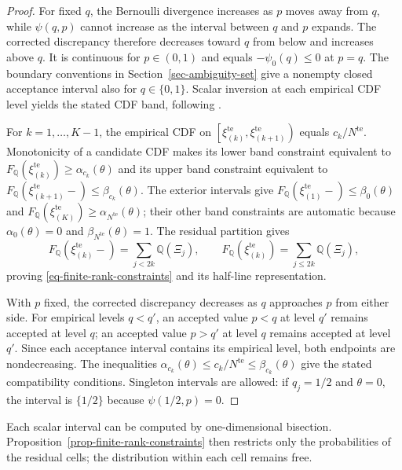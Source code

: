 \begin{proof}
  For fixed $q$, the Bernoulli divergence increases as $p$ moves away from $q$, while $\psi(q,p)$ cannot increase as the interval between $q$ and $p$ expands. The corrected discrepancy therefore decreases toward $q$ from below and increases above $q$. It is continuous for $p\in(0,1)$ and equals $-\psi_0(q)\le0$ at $p=q$. The boundary conventions in Section~\ref{sec-ambiguity-set} give a nonempty closed acceptance interval also for $q\in\{0,1\}$. Scalar inversion at each empirical CDF level yields the stated CDF band, following \citet[Supplement, Section~S.6]{L.J23}.

  For $k=1,\ldots,K-1$, the empirical CDF on $\left[\xi_{(k)}^{\mathrm{te}},\xi_{(k+1)}^{\mathrm{te}}\right)$ equals $c_k/N^{\mathrm{te}}$. Monotonicity of a candidate CDF makes its lower band constraint equivalent to $F_{\mathbb Q}\left(\xi_{(k)}^{\mathrm{te}}\right)\ge\alpha_{c_k}(\theta)$ and its upper band constraint equivalent to $F_{\mathbb Q}\left(\xi_{(k+1)}^{\mathrm{te}}-\right)\le\beta_{c_k}(\theta)$. The exterior intervals give $F_{\mathbb Q}\left(\xi_{(1)}^{\mathrm{te}}-\right)\le\beta_0(\theta)$ and $F_{\mathbb Q}\left(\xi_{(K)}^{\mathrm{te}}\right)\ge\alpha_{N^{\mathrm{te}}}(\theta)$; their other band constraints are automatic because $\alpha_0(\theta)=0$ and $\beta_{N^{\mathrm{te}}}(\theta)=1$. The residual partition gives
  \[
    F_{\mathbb Q}\left(\xi_{(k)}^{\mathrm{te}}-\right)=\sum_{j<2k}\mathbb Q(\Xi_j),
    \qquad
    F_{\mathbb Q}\left(\xi_{(k)}^{\mathrm{te}}\right)=\sum_{j\le2k}\mathbb Q(\Xi_j),
  \]
  proving \eqref{eq-finite-rank-constraints} and its half-line representation.

  With $p$ fixed, the corrected discrepancy decreases as $q$ approaches $p$ from either side. For empirical levels $q<q'$, an accepted value $p<q$ at level $q'$ remains accepted at level $q$; an accepted value $p>q'$ at level $q$ remains accepted at level $q'$. Since each acceptance interval contains its empirical level, both endpoints are nondecreasing. The inequalities $\alpha_{c_k}(\theta)\le c_k/N^{\mathrm{te}}\le\beta_{c_k}(\theta)$ give the stated compatibility conditions. Singleton intervals are allowed: if $q_j=1/2$ and $\theta=0$, the interval is $\{1/2\}$ because $\psi(1/2,p)=0$.
\end{proof}

Each scalar interval can be computed by one-dimensional bisection. Proposition~\ref{prop-finite-rank-constraints} then restricts only the probabilities of the residual cells; the distribution within each cell remains free.

